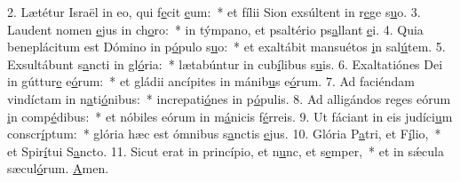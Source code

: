 2. Lætétur Israël in eo, qui f\uline{e}cit \uline{e}um:~* et fílii Sion exsúltent in r\uline{e}ge s\uline{u}o.
3. Laudent nomen \uline{e}jus in ch\uline{o}ro:~* in týmpano, et psaltério ps\uline{a}llant \uline{e}i.
4. Quia beneplácitum est Dómino in p\uline{ó}pulo s\uline{u}o:~* et exaltábit mansuétos \uline{i}n sal\uline{ú}tem.
5. Exsultábunt s\uline{a}ncti in gl\uline{ó}ria:~* lætabúntur in cub\uline{í}libus s\uline{u}is.
6. Exaltatiónes Dei in gúttur\uline{e} e\uline{ó}rum:~* et gládii ancípites in mánib\uline{u}s e\uline{ó}rum.
7. Ad faciéndam vindíctam in n\uline{a}ti\uline{ó}nibus:~* increpati\uline{ó}nes in p\uline{ó}pulis.
8. Ad alligándos reges eórum \uline{i}n comp\uline{é}dibus:~* et nóbiles eórum in m\uline{á}nicis f\uline{é}rreis.
9. Ut fáciant in eis judíci\uline{u}m conscr\uline{í}ptum:~* glória hæc est ómnibus s\uline{a}nctis \uline{e}jus.
10. Glória P\uline{a}tri, et F\uline{í}lio,~* et Spir\uline{í}tui S\uline{a}ncto.
11. Sicut erat in princípio, et n\uline{u}nc, et s\uline{e}mper,~* et in sǽcula sæcul\uline{ó}rum. \uline{A}men.
